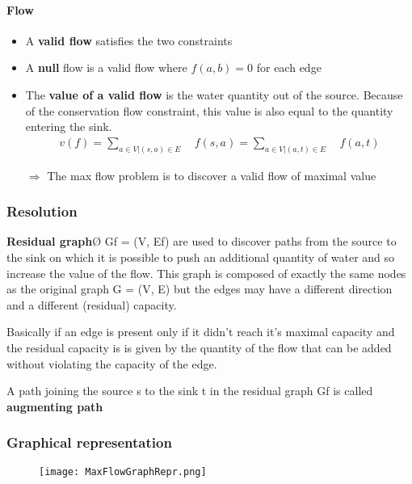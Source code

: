 \paragraph{Flow}
\begin{itemize} 
    \item A \textbf{valid flow} satisfies the two constraints
    \item A \textbf{null} flow is a valid flow where $f(a,b)=0$ for each
        edge
    \item The \textbf{value of a valid flow} is the water quantity out
        of the source. Because of the conservation flow constraint, this
        value is also equal to the quantity entering the sink.
        \begin{eqnarray*}
            v(f) =    \sum_{a \in V |(s,a) \in E} \quad f(s,a)  =
            \sum_{a \in V|(a,t) \in E}
            \quad f(a,t) 
        \end{eqnarray*}

    \item[$\Rightarrow$] The max flow problem is to discover a valid flow of
maximal value
\end{itemize}


\subsubsection{Resolution}

\textbf{Residual graph}Ø Gf = (V, Ef) are used to discover paths from the
source to the sink on which it is possible to push an
additional quantity of water and so increase the value of the
flow. This graph is composed of exactly the same nodes as the
original graph G = (V, E) but the edges may have a different
direction and a different (residual) capacity.

Basically if an edge is present only if it didn't reach it's maximal capacity and 
the residual capacity is is given by the quantity of the flow that can be added 
without violating the capacity of the edge.

A path joining the source s to the sink t in the residual graph Gf is
called \textbf{augmenting path}

\subsubsection{Graphical representation}

\begin{figure}[!ht]
    \centering
    \texttt{[image: MaxFlowGraphRepr.png]}
\end{figure}
\FloatBarrier

